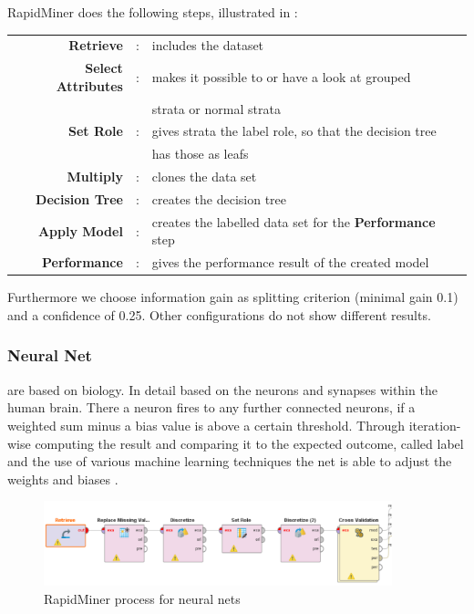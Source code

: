 	RapidMiner does the following steps, illustrated in :
	
	\begin{tabular}{r c l}
		\textbf{Retrieve} & : & includes the dataset\\
		\textbf{Select Attributes} & : & makes it possible to or have a look at grouped\\
		&& strata or normal strata\\
		\textbf{Set Role} & : & gives strata the label role, so that the decision tree\\
		&& has those as leafs\\
		\textbf{Multiply} & : & clones the data set \\
		\textbf{Decision Tree} &: & creates the decision tree\\
		\textbf{Apply Model} & : & creates the labelled data set for the \textbf{Performance} step\\
		\textbf{Performance} & : & gives the performance result of the created model\\
	\end{tabular}
	
	Furthermore we choose information gain as splitting criterion (minimal gain 0.1) and a confidence of 0.25. Other configurations do not show different results.
	\vspace*{-1em}

	\subsubsection{Neural Net}
	are based on biology. In detail based on the neurons and synapses within the human brain. There a neuron fires to any further connected neurons, if a weighted sum minus a bias value is above a certain threshold.
	Through iteration-wise computing the result and comparing it to the expected outcome, called label and the use of various machine learning techniques the net is able to adjust the weights and biases \cite{neuralNet}.
	
	\vspace*{-2em}
	\begin{figure}[H]
		\centering
		\includegraphics[width = 0.9\textwidth]{RapidNN.PNG}
		\caption{RapidMiner process for neural nets}
		\vspace*{-1em}
	\end{figure}
	
